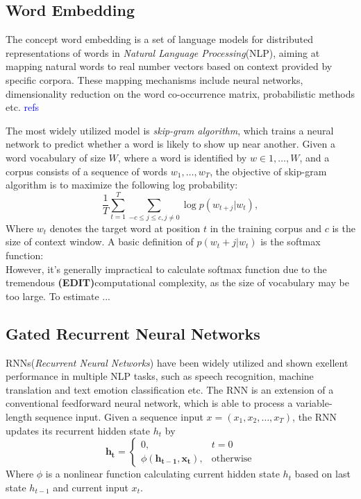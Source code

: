 \documentclass[conference]{IEEEtran}
\begin{document}
\subsection{Word Embedding}
The concept word embedding is a set of language models for distributed representations of words in \textit{Natural Language Processing}(NLP), 
aiming at mapping natural words to real number vectors based on context provided by specific corpora.
These mapping mechanisms include neural networks, dimensionality reduction on the word co-occurrence matrix, probabilistic methods etc. \textcolor{blue}{refs}


The most widely utilized model is \textit{skip-gram algorithm}\cite{SkipGram}, 
which trains a neural network to predict whether a word is likely to show up near another.
Given a word vocabulary of size $W$, where a word is identified by $w \in {1,\dots,W}$, 
and a corpus consists of a sequence of words $w_1, \dots, w_T$, the objective of skip-gram algorithm is to maximize the following log probability:
\begin{equation}
\frac{1}{T}\sum_{t=1}^{T}\sum_{-c \leq j \leq c,j \neq 0} \log p(w_{t+j} | w_t),
\end{equation}
Where $w_t$ denotes the target word at position $t$ in the training corpus and $c$ is the size of context window.
A basic definition of $p(w_t+j | w_t)$ is the softmax function:
\begin{equation}
\end{equation}
However, it's generally impractical to calculate softmax function due to the tremendous \textbf{(EDIT)}computational complexity,
as the size of vocabulary may be too large.
To estimate ...

\subsection{Gated Recurrent Neural Networks}
RNNs(\textit{Recurrent Neural Networks}) have been widely utilized and shown exellent performance in multiple NLP tasks,
such as speech recognition, machine translation and text emotion classification etc.
The RNN is an extension of a conventional feedforward neural network, which is able to process a variable-length sequence input.
Given a sequence input $x = (x_1, x_2, \dots, x_T)$, the RNN updates its recurrent hidden state $h_t$ by
\begin{equation}
    \mathbf{h_t}=
        \begin{cases}
            0, &t=0 \\
            \phi(\mathbf{h_{t-1}, \mathbf{x_t}}), &\text{otherwise}
        \end{cases}
\end{equation}
Where $\phi$ is a nonlinear function calculating current hidden state $h_t$ based on last state $h_{t-1}$ and current input $x_t$.
\end{document}
